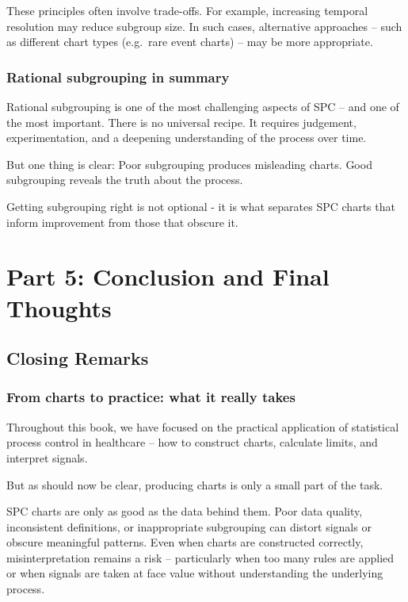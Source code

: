 \documentclass[
]{book}
\begin{document}
These principles often involve trade-offs. For example, increasing temporal resolution may reduce subgroup size. In such cases, alternative approaches -- such as different chart types (e.g.~rare event charts) -- may be more appropriate.

\section{Rational subgrouping in summary}\label{rational-subgrouping-in-summary}

Rational subgrouping is one of the most challenging aspects of SPC -- and one of the most important. There is no universal recipe. It requires judgement, experimentation, and a deepening understanding of the process over time.

But one thing is clear: Poor subgrouping produces misleading charts. Good subgrouping reveals the truth about the process.

Getting subgrouping right is not optional - it is what separates SPC charts that inform improvement from those that obscure it.

\part*{Part 5: Conclusion and Final Thoughts}\label{part-part-5-conclusion-and-final-thoughts}

\chapter{Closing Remarks}\label{closing-remarks}

\section{From charts to practice: what it really takes}\label{from-charts-to-practice-what-it-really-takes}

Throughout this book, we have focused on the practical application of statistical process control in healthcare -- how to construct charts, calculate limits, and interpret signals.

But as should now be clear, producing charts is only a small part of the task.

SPC charts are only as good as the data behind them. Poor data quality, inconsistent definitions, or inappropriate subgrouping can distort signals or obscure meaningful patterns. Even when charts are constructed correctly, misinterpretation remains a risk -- particularly when too many rules are applied or when signals are taken at face value without understanding the underlying process.
\end{document}
